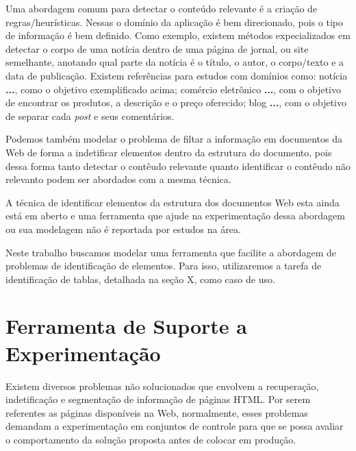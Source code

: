 \documentclass{acm_proc_article-sp}
\newcommand{\remove}[1]{}
\numberwithin{equation}{section}
\begin{document}
Uma abordagem comum para detectar o conteúdo relevante é a criação de
regras/heurísticas. 
	Nessas 
		o domínio da aplicação é bem direcionado, pois o tipo de informação é 
		bem definido.
		Como exemplo,
			existem métodos expecializados em detectar o corpo de uma notícia 
			dentro de uma página de jornal, ou site semelhante,
			anotando qual parte da notícia é 
				o título,
				o autor, o corpo/texto e
				a data de publicação.
			Existem referências para estudos com domínios como:
				notícia {\bf \cite{}...}, como o objetivo exemplificado acima;
				comércio eletrônico {\bf \cite{}...}, com o objetivo de 
				encontrar os produtos, a descrição e o preço oferecido;
				blog {\bf \cite{}...}, com o objetivo de separar cada 
				{\it post} e seus comentários.

Podemos também modelar o problema de filtar a informação em documentos da Web
de forma a indetificar elementos dentro da estrutura do documento, pois 
dessa forma tanto detectar o contêudo relevante quanto identificar o contêudo 
não relevanto podem ser abordados com a mesma técnica. 

A técnica de identificar elementos da estrutura dos documentos Web esta
ainda está em aberto e uma ferramenta que ajude na experimentação dessa
abordagem ou sua modelagem não é reportada por estudos na área.

Neste trabalho buscamos modelar uma ferramenta que facilite a abordagem
de problemas de identificação de elementos. Para isso,
utilizaremos a tarefa de identificação de tablas, detalhada na seção X,
como caso de uso.

\remove{
Embora estudos como \cite{}... apresentem resutados "interessantes" na detecção de templates, 
}


\section{Ferramenta de Suporte a Experimentação}


Existem diversos problemas não solucionados que envolvem a
recuperação, indetificação e segmentação de 
informação de páginas HTML. Por serem referentes as
páginas disponíveis na Web, normalmente, esses problemas demandam a
experimentação em conjuntos de controle para que se possa avaliar o
comportamento da solução proposta antes de colocar em produção.
\end{document}
